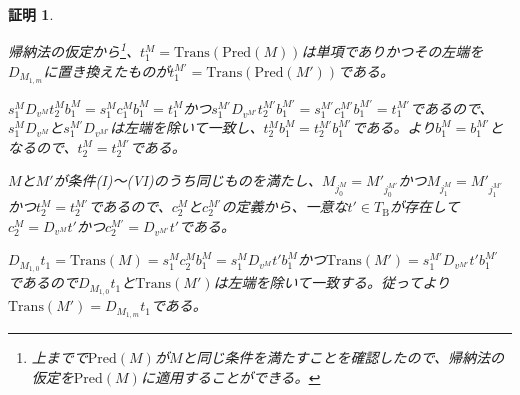 \documentclass[dvipdfmx,uplatex]{jsarticle}
\newif\iffull
\theoremstyle{customnonumberbreakfortheorem}
\theoremstyle{customnonumberbreakforproof}
\newtheorem{hideableproof}{証明}
\begin{document}
\begin{hideableproof}
\begin{indented}
\begin{indented}
			\item 帰納法の仮定から\footnote{上までで\(\textrm{Pred}(M)\)が\(M\)と同じ条件を満たすことを確認したので、帰納法の仮定を\(\textrm{Pred}(M)\)に適用することができる。}、\(t_1^M = \textrm{Trans}(\textrm{Pred}(M))\)は単項でありかつその左端を\(D_{M_{1,m}}\)に置き換えたものが\(t_1^{M'} = \textrm{Trans}(\textrm{Pred}(M'))\)である。
			\item \(s_1^M D_{v^M} t_2^M b_1^M  = s_1^M c_1^M b_1^M = t_1^M\)かつ\(s_1^{M'} D_{v^{M'}} t_2^{M'} b_1^{M'} = s_1^{M'} c_1^{M'} b_1^{M'} = t_1^{M'}\)であるので、\(s_1^M D_{v^M}\)と\(s_1^{M'} D_{v^{M'}}\)は左端を除いて一致し、\(t_2^M b_1^M = t_2^{M'} b_1^{M'}\)である。より\(b_1^M = b_1^{M'}\)となるので、\(t_2^M = t_2^{M'}\)である。
			\item \(M\)と\(M'\)が条件(I)～(VI)のうち同じものを満たし、\(M_{j_0^M} = M'_{j_0^{M'}}\)かつ\(M_{j_1^M} = M'_{j_1^{M'}}\)かつ\(t_2^M = t_2^{M'}\)であるので、\(c_2^M\)と\(c_2^{M'}\)の定義から、一意な\(t' \in T_{\textrm{B}}\)が存在して\(c_2^M = D_{v^M} t'\)かつ\(c_2^{M'} = D_{v^{M'}} t'\)である。
			\item \(D_{M_{1,0}} t_1 = \textrm{Trans}(M) = s_1^M c_2^M b_1^M = s_1^M D_{v^M} t' b_1^M\)かつ\(\textrm{Trans}(M') = s_1^{M'} D_{v^{M'}} t' b_1^{M'}\)であるので\(D_{M_{1,0}} t_1\)と\(\textrm{Trans}(M')\)は左端を除いて一致する。従ってより\(\textrm{Trans}(M') = D_{M_{1,m}} t_1\)である。
		\end{indented}
	\end{indented}
\end{hideableproof}

\iffull{それでは本題に戻る。}\fi
\end{document}
